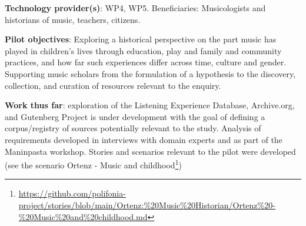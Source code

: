 \textbf{Technology provider(s)}: WP4, WP5. Beneficiaries: Musicologists and historians of music, teachers, citizens. 

\textbf{Pilot objectives}: Exploring a historical perspective on the part music has played in children’s lives through education, play and family and community practices, and how far such experiences differ across time, culture and gender. 
Supporting music scholars from the formulation of a hypothesis to the discovery, collection, and curation of resources relevant to the enquiry. 

\textbf{Work thus far}: exploration of the Listening Experience Database, Archive.org, and Gutenberg Project is under development with the goal of defining a corpus/registry of sources potentially relevant to the study. Analysis of requirements developed in interviews with domain experts and as part of the Maninpasta workshop. Stories and scenarios relevant to the pilot were developed (see the scenario Ortenz - Music and childhood\footnote{\url{https://github.com/polifonia-project/stories/blob/main/Ortenz:\%20Music\%20Historian/Ortenz\%20-\%20Music\%20and\%20childhood.md}})




